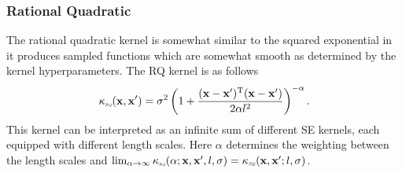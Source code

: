 \documentclass[10pt,a4paper]{article}
\numberwithin{equation}{section}
\theoremstyle{plain}
\theoremstyle{definition}
\theoremstyle{own}
\begin{document}
\subsubsection{Rational Quadratic}
The rational quadratic kernel is somewhat similar to the squared exponential in it produces sampled functions which are somewhat smooth as determined by the kernel hyperparameters. The RQ kernel is as follows
\begin{equation}
\kappa_{\scaleto{\textit{RQ}}{3pt}}(\mathbf{x}, \mathbf{x^{\prime}}) = \sigma^2 \left( 1 + \frac{( \mathbf{x} - \mathbf{x}^{\prime} )^{\text{T}}( \mathbf{x} - \mathbf{x}^{\prime} )}{2 \alpha l^2} \right)^{-\alpha}.
\end{equation}
This kernel can be interpreted as an infinite sum of different SE kernels, each equipped with different length scales. Here $\alpha$ determines the weighting between the length scales and $\lim_{\alpha \to \infty} \kappa_{\scaleto{\textit{RQ}}{3pt}}(\alpha; \mathbf{x}, \mathbf{x^{\prime}}, l, \sigma) = \kappa_{\scaleto{\textit{SE}}{3pt}}(\mathbf{x}, \mathbf{x^{\prime}}; l, \sigma)$.
\pagebreak 
\begin{bibdiv}
\begin{biblist}
\end{biblist}
\end{bibdiv}
\end{document}
